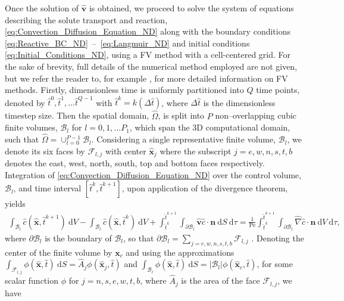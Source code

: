 \documentclass[preprint, 1p, authoryear]{elsarticle}
\begin{document}
Once the solution of $\hat{\mathbf{v}}$ is obtained, we proceed to solve the system of equations describing the solute transport and reaction, \eqref{eq:Convection_Diffusion_Equation_ND} along with the boundary conditions \eqref{eq:Reactive_BC_ND}~--~\eqref{eq:Langmuir_ND} and initial conditions \eqref{eq:Initial_Conditions_ND}, using a FV method with a cell-centered grid. For the sake of brevity, full details of the numerical method employed are not given, but we refer the reader to, for example \citet{causonintroductory}, for more detailed information on  FV methods.  
Firstly, dimensionless time is uniformly partitioned into $Q$ time points, denoted by $\hat{t}^0, \hat{t}^1,\ldots \hat{t}^{Q-1}$ with $\hat{t}^{k} = k \left(\Delta \hat{t}\right)$, where $\Delta \hat{t}$ is the dimensionless timestep size. 
Then the spatial  domain, $\hat{\Omega}$, is  split into $P$ non--overlapping cubic finite volumes, $\mathcal{B}_l$ for $l = 0, 1, \ldots P_1$, which span the 3D computational domain, such that $\hat{\Omega} = \cup_{l=0}^{P-1} \mathcal{B}_l$. Considering a single representative finite volume, $\mathcal{B}_l$, we denote its six faces by $\mathcal{F}_{l,j}$ with center $\hat{\mathbf{x}}_j$ where the subscript $j=e,w,n,s,t,b$ denotes the east, west, north, south, top and bottom faces respectively. Integration of \eqref{eq:Convection_Diffusion_Equation_ND} over the control volume, $\mathcal{B}_l$, and time interval $[\hat{t}^{k}, \hat{t}^{k+1}]$, upon application of the divergence theorem, yields
\begin{align*}
\int_{\mathcal{B}_l} \hat{c}(\hat{\mathbf{x}}, \hat{t}^{k+1}) \: \mathrm{d} V - \int_{\mathcal{B}_l} \hat{c}(\hat{\mathbf{x}}, \hat{t}^{k}) \: \mathrm{d} V+\int_{\hat{t}^{k}}^{\hat{t}^{k+1}}\int_{\partial \mathcal{B}_l} \hat{\mathbf{v}} \hat{c} \cdot \mathbf{n} \: \mathrm{d} S \: \mathrm{d}\tau = \frac{1}{\mathrm{Pe}} \int_{\hat{t}^{k}}^{\hat{t}^{k+1}}\int_{\partial \mathcal{B}_l} \hat{\nabla} \hat{c} \cdot \mathbf{n}\: \mathrm{d} V \: \mathrm{d} \tau,
\end{align*}
where $\partial \mathcal{B}_l$ is the boundary of $\mathcal{B}_l$, so that $\partial \mathcal{B}_l = \sum_{j=e,w,n,s,t,b} \mathcal{F}_{l,j}$ . 
Denoting the center of the finite volume by $\mathbf{x}_c$ and using the approximations $\displaystyle\int_{\mathcal{F}_{l,j}} \phi(\hat{\mathbf{x}},\hat{t}) \: \mathrm{d}S =\hat{A}_j \phi(\hat{\mathbf{x}}_j,\hat{t})$ and $\displaystyle\int_{\mathcal{B}_l} \phi(\hat{\mathbf{x}},\hat{t}) \: \mathrm{d}S =|\mathcal{B}_l| \phi(\hat{\mathbf{x}}_c,\hat{t})$, for some scalar function $\phi$ for $j=n,s,e,w,t,b$, where $\hat{A}_j$ is the area of the face $\mathcal{F}_{l,j}$, we have
\end{document}
